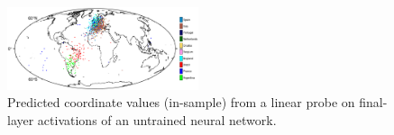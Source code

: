 \documentclass{article}
\theoremstyle{plain}
\theoremstyle{definition}
\theoremstyle{remark}
\begin{document}



\begin{figure}

{\centering \includegraphics[width=0.5\textwidth]{results/figures/map.png}

}

\caption{\label{fig-map}Predicted coordinate values (in-sample) from a linear probe on final-layer activations of an untrained neural network.}

\end{figure}
\end{document}
